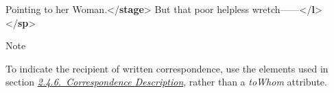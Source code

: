 \begin{reflist}
\begin{sansreflist}
\begin{reflist}
Pointing to her Woman.{</\textbf{stage}>}\mbox{}\newline 
{}But that poor helpless wretch——{</\textbf{l}>}\mbox{}\newline 
{</\textbf{sp}>}
    \item[{Note}]
  \par
To indicate the recipient of written correspondence, use the elements used in section \textit{\hyperref[HD44CD]{2.4.6.\ Correspondence Description}}, rather than a {\itshape toWhom} attribute.
\end{reflist}  
\end{sansreflist}  
\end{reflist}  
